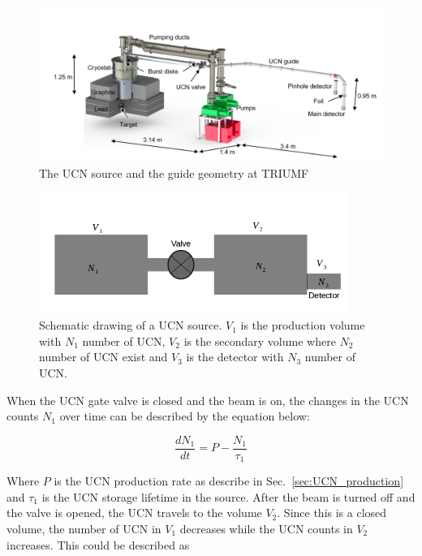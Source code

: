 \begin{figure}[h]
  \centering
  \includegraphics[width=1.1\textwidth]{Source_all.png}
  \caption{The UCN source and the guide geometry at TRIUMF }
  \label{fig:Source_all}
\end{figure}






\begin{figure}[h]
  \centering
  \includegraphics[width=0.9\textwidth]{volume_schematic.png}
  \caption{Schematic drawing of a UCN source. $V_1$ is the production
    volume with $N_1$ number of UCN, $V_2$ is the secondary volume
    where $N_2$ number of UCN exist and $V_3$ is the detector with
    $N_3$ number of UCN. }
  \label{fig:volume_schematic}
\end{figure}



When the UCN gate valve is closed and the beam is on, the changes in
the UCN counts $N_1$ over time can be described by the equation below:

\begin{equation}
\frac{dN_1}{dt} = P - \frac{N_1}{\tau_1}  
\end{equation}

Where $P$ is the UCN production rate as describe in
Sec.~\ref{sec:UCN_production} and $\tau_1$ is the UCN storage lifetime
in the source. After the beam is turned off and the valve is opened,
the UCN travels to the volume $V_2$. Since this is a closed volume,
the number of UCN in $V_1$ decreases while the UCN counts in $V_2$
increases. This could be described as

